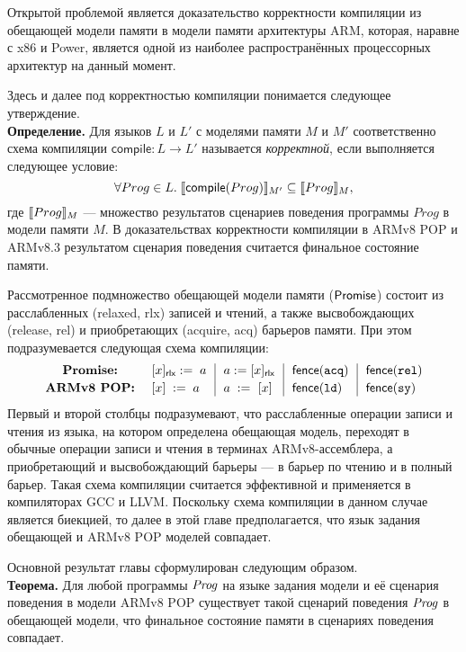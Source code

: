 Открытой проблемой является доказательство корректности компиляции из обещающей модели памяти в модели памяти архитектуры
ARM, которая, наравне с x86 и Power, является одной из наиболее распространённых процессорных архитектур на данный момент.

Здесь и далее под корректностью компиляции понимается следующее утверждение.\\
\textbf{Определение.} Для языков $L$ и $L'$ с моделями памяти $M$ и $M'$ соответственно схема компиляции $\textsf{compile} : L \rightarrow L'$
называется \emph{корректной}, если выполняется следующее условие:
\[ \forall Prog \in L. \; \llbracket\textsf{compile}(Prog)\rrbracket_{M'} \subseteq \llbracket Prog\rrbracket_{M}, \]
где $\llbracket Prog\rrbracket_{M}$ --- множество результатов сценариев поведения программы $Prog$ в модели памяти $M$.
В доказательствах корректности компиляции в ARMv8 POP и ARMv8.3 результатом сценария поведения считается
финальное состояние памяти.

Рассмотренное подмножество обещающей модели памяти ($\mathsf{Promise}$) состоит из расслабленных (relaxed, rlx) записей и чтений,
а также высвобождающих (release, rel) и приобретающих (acquire, acq) барьеров памяти. При этом подразумевается следующая
схема компиляции:
\[
  \begin{array}{c@{~~}@{~~}l@{~~}|@{~~}l@{~~}|@{~~}l@{~~}|@{~~}l}
    \textbf{Promise:}   & [x]_{\textsf{rlx}} := \; a & a := [x]_{\textsf{rlx}}  &  \acqFence & \relFence \\[2pt]
    \textbf{ARMv8 POP:} & \writeInst{x}{a}    & \readInst{a}{x}  &  \dmbLD & \dmbSY \\
  \end{array}
\]
Первый и второй столбцы подразумевают, что расслабленные операции записи и чтения из языка, на котором определена обещающая модель,
переходят в обычные операции записи и чтения в терминах ARMv8-ассемблера, а приобретающий и высвобождающий барьеры --- в барьер
по чтению и в полный барьер. Такая схема компиляции считается эффективной и применяется в компиляторах GCC и LLVM.
Поскольку схема компиляции в данном случае является биекцией, то далее в этой главе предполагается, что язык задания обещающей и ARMv8 POP
моделей совпадает.

Основной результат главы %
сформулирован следующим образом. \\
\textbf{Теорема.} Для любой программы $\mathit{Prog}$ на языке задания модели и её сценария поведения в модели ARMv8 POP существует
такой сценарий поведения $\mathit{Prog}$ в обещающей модели, что финальное состояние памяти в сценариях поведения совпадает.

